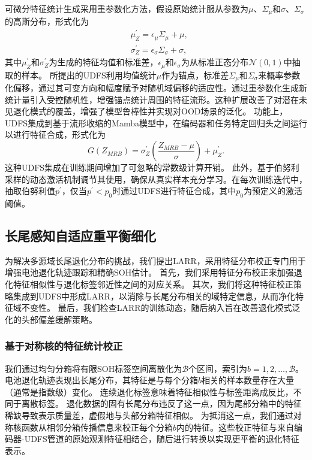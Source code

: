 \documentclass[UTF8,lettersize,journal]{IEEEtran}
\begin{document}
可微分特征统计生成采用重参数化方法，假设原始统计服从参数为$\mu$、$\Sigma_{\mu}$和$\sigma$、$\Sigma_{\sigma}$的高斯分布，形式化为
\begin{align}
    & \mu_{Z}^{\prime}=\epsilon_{\mu}\Sigma_{\mu}+\mu,  \\
    & \sigma_{Z}^{\prime}=\epsilon_{\sigma}\Sigma_{\sigma}+\sigma, 
\end{align}
其中$\mu_{Z}^{\prime}$和$\sigma_{Z}^{\prime}$为生成的特征均值和标准差，$\epsilon_{\mu}$和$\epsilon_{\sigma}$为从标准正态分布$\mathcal{N}(0, 1)$中抽取的样本。
% 
所提出的UDFS利用均值统计$\mu$作为锚点，标准差$\Sigma_{\mu}$和$\Sigma_{\sigma}$来概率参数化偏移，通过其可变方向和幅度赋予对随机域偏移的适应性。通过重参数化生成新统计量引入受控随机性，增强锚点统计周围的特征流形。这种扩展改善了对潜在未见退化模式的覆盖，增强了模型鲁棒性并实现对OOD场景的泛化。
% 
功能上，UDFS集成到基于流形收缩的Mamba模型中，在编码器和任务特定回归头之间运行以进行特征合成，形式化为
\begin{equation}
    G(Z_{MRB}) = \sigma_{Z}^{\prime}\left(\frac{Z_{MRB} - \mu}{\sigma}\right) + \mu_{Z}^{\prime}.
    \label{UDFS}
\end{equation}
这种UDFS集成在训练期间增加了可忽略的常数级计算开销。
此外，基于伯努利采样的动态激活机制调节其使用，确保从真实样本充分学习。在每次训练迭代中，抽取伯努利值$p^{\prime}$，仅当$p^{\prime} < p_{0}$时通过UDFS进行特征合成，其中$p_{0}$为预定义的激活阈值。

\subsection{长尾感知自适应重平衡细化}\label{susbec:LARR}

为解决多源域长尾退化分布的挑战，我们提出LARR，采用特征分布校正专门用于增强电池退化轨迹跟踪和精确SOH估计。
首先，我们采用特征分布校正来加强退化特征相似性与退化标签邻近性之间的对应关系。
其次，我们将这种特征校正策略集成到UDFS中形成LARR，以消除与长尾分布相关的域特定信息，从而净化特征域不变性。
最后，我们检查LARR的训练动态，随后纳入旨在改善退化模式泛化的头部偏差缓解策略。

\subsubsection{基于对称核的特征统计校正}

我们通过均匀分箱将有限SOH标签空间离散化为$\mathcal{B}$个区间，索引为$\textit{b} = 1, 2, \dots, \mathcal{B}$。电池退化轨迹表现出长尾分布，其特征是与每个分箱$\textit{b}$相关的样本数量存在大量（通常是指数级）变化。
% 
连续退化标签意味着特征相似性与标签距离成反比，不同于离散标签。
% 
退化数据的固有长尾分布违反了这一点，因为尾部分箱中的特征稀缺导致表示质量差，虚假地与头部分箱特征相似。
% 
为抵消这一点，我们通过对称核函数从相邻分箱传播信息来校正每个分箱$\textit{b}$内的特征。这些校正特征与来自编码器-UDFS管道的原始观测特征相结合，随后进行转换以实现更平衡的退化特征表示。
\end{document}
